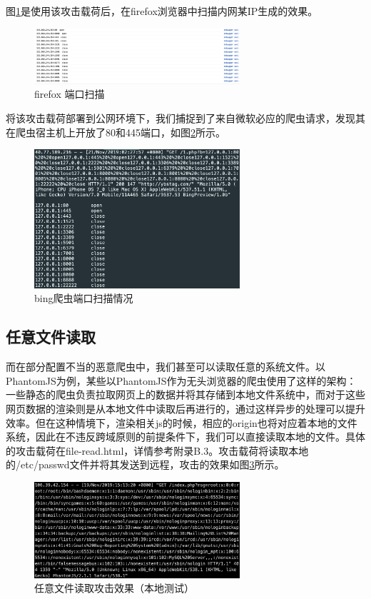 \documentclass[doctor,privacy,twoside]{buaa_mac}
\begin{document}
图\ref{fig:portscan}是使用该攻击载荷后，在firefox浏览器中扫描内网某IP生成的效果。
\centerline{}
\begin{figure}[!h]
  \centering
  \includegraphics[width=0.68\textwidth]{images/portscan.png}
  \caption{firefox 端口扫描}
  \label{fig:portscan}
\end{figure}
\centerline{}

将该攻击载荷部署到公网环境下，我们捕捉到了来自微软必应的爬虫请求，发现其在爬虫宿主机上开放了80和445端口，如图\ref{fig:bingscan}所示。
\centerline{}
\begin{figure}[!h]
  \centering
  \includegraphics[width=0.68\textwidth]{images/bing_crawler_portscan.png}
  \caption{bing爬虫端口扫描情况}
  \label{fig:bingscan}
\end{figure}
\centerline{}


\subsection{任意文件读取}
而在部分配置不当的恶意爬虫中，我们甚至可以读取任意的系统文件。以PhantomJS为例，某些以PhantomJS作为无头浏览器的爬虫使用了这样的架构：一些静态的爬虫负责拉取网页上的数据并将其存储到本地文件系统中，而对于这些网页数据的渲染则是从本地文件中读取后再进行的，通过这样异步的处理可以提升效率。但在这种情境下，渲染相关js的时候，相应的origin也将对应着本地的文件系统，因此在不违反跨域原则的前提条件下，我们可以直接读取本地的文件。具体的攻击载荷在file-read.html，详情参考附录B.3。攻击载荷将读取本地的/etc/passwd文件并将其发送到远程，攻击的效果如图\ref{fig:fileread}所示。

\centerline{}
\begin{figure}[!h]
  \centering
  \includegraphics[width=0.68\textwidth]{images/file_read.png}
  \caption{任意文件读取攻击效果（本地测试）}
  \label{fig:fileread}
\end{figure}
\centerline{}
\end{document}
